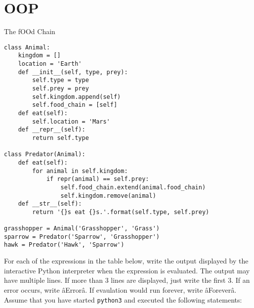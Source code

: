 \documentclass{exam}
\begin{document}
\section{OOP}
\begin{questions}
\item The fOOd Chain
\begin{lstlisting}
class Animal:
    kingdom = []
    location = 'Earth'
    def __init__(self, type, prey):
        self.type = type
        self.prey = prey
        self.kingdom.append(self)
        self.food_chain = [self]
    def eat(self):
        self.location = 'Mars'
    def __repr__(self):
        return self.type
    
class Predator(Animal):
    def eat(self):
        for animal in self.kingdom:
            if repr(animal) == self.prey:
                self.food_chain.extend(animal.food_chain)
                self.kingdom.remove(animal)
    def __str__(self):
        return '{}s eat {}s.'.format(self.type, self.prey)

grasshopper = Animal('Grasshopper', 'Grass')
sparrow = Predator('Sparrow', 'Grasshopper')
hawk = Predator('Hawk', 'Sparrow')
\end{lstlisting}
\clearpage
For each of the expressions in the table below, write the output displayed by the interactive Python interpreter when the expression is evaluated. The output may have multiple lines. If more than 3 lines are displayed, just write the first 3. If an error occurs, write âErrorâ. If evaulation would run forever, write âForeverâ.\\
Assume that you have started \texttt{python3} and executed the following statements:


\end{questions}
\end{document}
